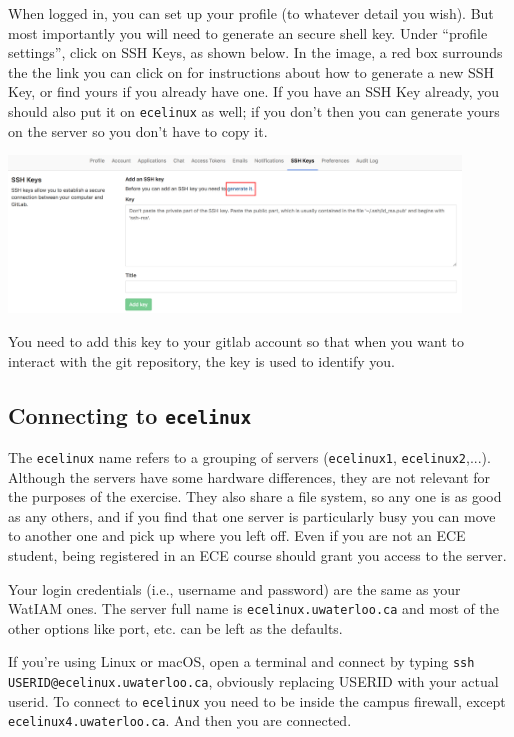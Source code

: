 When logged in, you can set up your profile (to whatever detail you wish). But most importantly you will need to generate an secure shell key. Under ``profile settings'', click on SSH Keys, as shown below. In the image, a red box surrounds the the link you can click on for instructions about how to generate a new SSH Key, or find yours if you already have one. If you have an SSH Key already, you should also put it on \texttt{ecelinux} as well; if you don't then you can generate yours on the server so you don't have to copy it.

\begin{center}
	\includegraphics[width=0.9\textwidth]{images/gitlab-sshkey.png}
\end{center}

You need to add this key to your gitlab account so that when you want to interact with the git repository, the key is used to identify you.

\subsection*{Connecting to \texttt{ecelinux}}

The \texttt{ecelinux} name refers to a grouping of servers (\texttt{ecelinux1}, \texttt{ecelinux2},...). Although the servers have some hardware differences, they are not relevant for the purposes of the exercise. They also share a file system, so any one is as good as any others, and if you find that one server is particularly busy you can move to another one and pick up where you left off. Even if you are not an ECE student, being registered in an ECE course should grant you access to the server.

Your login credentials (i.e., username and password) are the same as your WatIAM ones. The server full name is \texttt{ecelinux.uwaterloo.ca} and most of the other options like port, etc. can be left as the defaults. 

If you're using Linux or macOS, open a terminal and connect by typing \texttt{ssh USERID@ecelinux.uwaterloo.ca}, obviously replacing USERID with your actual userid. To connect to \texttt{ecelinux} you need to be inside the campus firewall, except \texttt{ecelinux4.uwaterloo.ca}. And then you are connected. 

